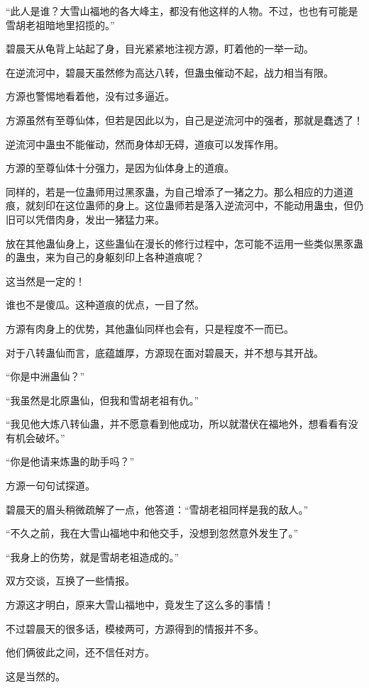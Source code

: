 \begin{this_body}
“此人是谁？大雪山福地的各大峰主，都没有他这样的人物。不过，也也有可能是雪胡老祖暗地里招揽的。”

碧晨天从龟背上站起了身，目光紧紧地注视方源，盯着他的一举一动。

在逆流河中，碧晨天虽然修为高达八转，但蛊虫催动不起，战力相当有限。

方源也警惕地看着他，没有过多逼近。

方源虽然有至尊仙体，但若是因此以为，自己是逆流河中的强者，那就是蠢透了！

逆流河中蛊虫不能催动，然而身体却无碍，道痕可以发挥作用。

方源的至尊仙体十分强力，是因为仙体身上的道痕。

同样的，若是一位蛊师用过黑豕蛊，为自己增添了一猪之力。那么相应的力道道痕，就刻印在这位蛊师的身上。这位蛊师若是落入逆流河中，不能动用蛊虫，但仍旧可以凭借肉身，发出一猪猛力来。

放在其他蛊仙身上，这些蛊仙在漫长的修行过程中，怎可能不运用一些类似黑豕蛊的蛊虫，来为自己的身躯刻印上各种道痕呢？

这当然是一定的！

谁也不是傻瓜。这种道痕的优点，一目了然。

方源有肉身上的优势，其他蛊仙同样也会有，只是程度不一而已。

对于八转蛊仙而言，底蕴雄厚，方源现在面对碧晨天，并不想与其开战。

“你是中洲蛊仙？”

“我虽然是北原蛊仙，但我和雪胡老祖有仇。”

“我见他大炼八转仙蛊，并不愿意看到他成功，所以就潜伏在福地外，想看看有没有机会破坏。”

“你是他请来炼蛊的助手吗？”

方源一句句试探道。

碧晨天的眉头稍微疏解了一点，他答道：“雪胡老祖同样是我的敌人。”

“不久之前，我在大雪山福地中和他交手，没想到忽然意外发生了。”

“我身上的伤势，就是雪胡老祖造成的。”

双方交谈，互换了一些情报。

方源这才明白，原来大雪山福地中，竟发生了这么多的事情！

不过碧晨天的很多话，模棱两可，方源得到的情报并不多。

他们俩彼此之间，还不信任对方。

这是当然的。


\end{this_body}

